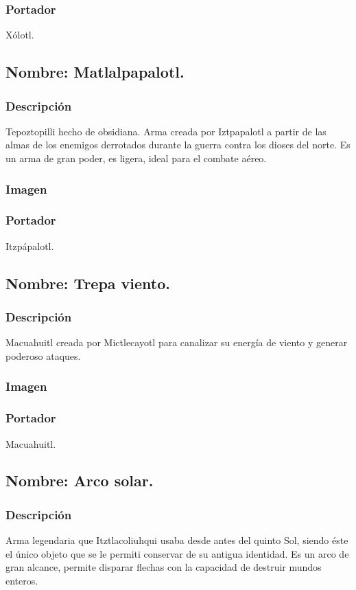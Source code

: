 \documentclass[11pt,letterpaper]{article}
\begin{document}
\subsubsection{Portador}
Xólotl.

\subsection{Nombre: Matlalpapalotl.}
\subsubsection{Descripción}
Tepoztopilli hecho de obsidiana. Arma creada por Iztpapalotl a partir de las almas de los enemigos derrotados durante la guerra contra los dioses del norte. Es un arma de gran poder, es ligera, ideal para el combate aéreo.
\subsubsection{Imagen}
\subsubsection{Portador}
Itzpápalotl.

\subsection{Nombre: Trepa viento.}
\subsubsection{Descripción}
Macuahuitl creada por Mictlecayotl para canalizar su energía de viento y generar poderoso ataques.
\subsubsection{Imagen}
\subsubsection{Portador}
Macuahuitl.

\subsection{Nombre: Arco solar.}
\subsubsection{Descripción}
Arma legendaria que Itztlacoliuhqui usaba desde antes del quinto Sol, siendo éste el único objeto que se le permiti conservar de su antigua identidad. Es un arco de gran alcance, permite disparar flechas con la capacidad de destruir mundos enteros. 
\end{document}
